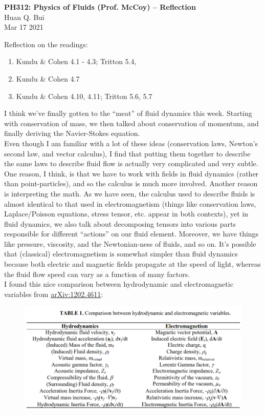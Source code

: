 \documentclass[11pt]{article}
\begin{document}
\begin{center}
{\large \bf PH312: Physics of Fluids (Prof. McCoy) -- Reflection}\\
{ Huan Q. Bui}\\
Mar 17 2021
\end{center}

\begin{framed}
	\noindent Reflection on the readings:
	\begin{enumerate}
		\item Kundu \& Cohen 4.1 - 4.3; Tritton 5.4,
		\item Kundu \& Cohen 4.7
		\item  Kundu \& Cohen 4.10, 4.11; Tritton 5.6, 5.7
	\end{enumerate}
\end{framed}



I think we've finally gotten to the ``meat'' of fluid dynamics this week. Starting with conservation of mass, we then talked about conservation of momentum, and finally deriving the Navier-Stokes equation. \\

Even though I am familiar with a lot of these ideas (conservation laws, Newton's second law, and vector calculus), I find that putting them together to describe the same laws to describe fluid flow is actually very complicated and very subtle. One reason, I think, is that we have to work with fields in fluid dynamics (rather than point-particles), and so the calculus is much more involved. Another reason is interpreting the math. As we have seen, the calculus used to describe fluids is almost identical to that used in electromagnetism (things like conservation laws, Laplace/Poisson equations, stress tensor, etc. appear in both contexts), yet in fluid dynamics, we also talk about decomposing tensors into various parts responsible for different ``actions'' on our fluid element. Moreover, we have things like pressure, viscosity, and the Newtonian-ness of fluids, and so on. It's possible that (classical) electromagnetism is somewhat simpler than fluid dynamics because both electric and magnetic fields propagate at the speed of light, whereas the fluid flow speed can vary as a function of many factors. \\

I found this nice comparison between hydrodynamic and electromagnetic variables from \href{https://arxiv.org/ftp/arxiv/papers/1202/1202.4611.pdf}{arXiv:1202.4611}:

\begin{figure}[!htb]
	\centering
	\includegraphics[scale=0.6]{compare}
\end{figure}




  
\end{document}
